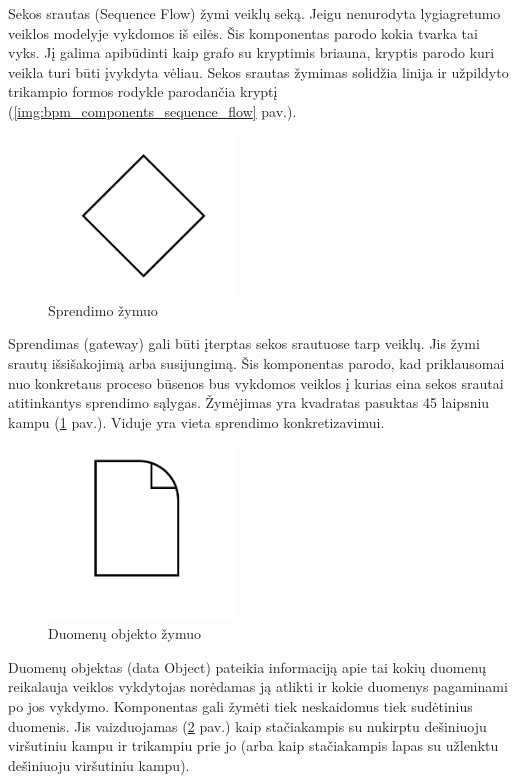 Sekos srautas (Sequence Flow) žymi veiklų seką. Jeigu nenurodyta lygiagretumo veiklos modelyje vykdomos iš eilės. Šis komponentas parodo kokia tvarka tai vyks. Jį galima apibūdinti kaip grafo su kryptimis briauna, kryptis parodo kuri veikla turi būti įvykdyta vėliau. Sekos srautas žymimas solidžia linija ir užpildyto trikampio formos rodykle parodančia kryptį (\ref{img:bpm_components_sequence_flow} pav.).

\begin{figure}[H]
	\centering
	\includegraphics[width=5cm]{img/bpm-components/gateway}
	\caption{Sprendimo žymuo}
	\label{img:bpm_components_gateway}
\end{figure}

Sprendimas (gateway) gali būti įterptas sekos srautuose tarp veiklų. Jis žymi srautų išsišakojimą arba susijungimą. Šis komponentas parodo, kad priklausomai nuo konkretaus proceso būsenos bus vykdomos veiklos į kurias eina sekos srautai atitinkantys sprendimo sąlygas. Žymėjimas yra kvadratas pasuktas 45 laipsniu kampu (\ref{img:bpm_components_gateway} pav.). Viduje yra vieta sprendimo konkretizavimui.

\begin{figure}[H]
	\centering
	\includegraphics[width=5cm]{img/bpm-components/data_object}
	\caption{Duomenų objekto žymuo}
	\label{img:bpm_components_data_object}
\end{figure}

Duomenų objektas (data Object) pateikia informaciją apie tai kokių duomenų reikalauja veiklos vykdytojas norėdamas ją atlikti ir kokie duomenys pagaminami po jos vykdymo. Komponentas gali žymėti tiek neskaidomus tiek sudėtinius duomenis. Jis vaizduojamas (\ref{img:bpm_components_data_object} pav.) kaip stačiakampis su nukirptu dešiniuoju viršutiniu kampu ir trikampiu prie jo (arba kaip stačiakampis lapas su užlenktu dešiniuoju viršutiniu kampu).

